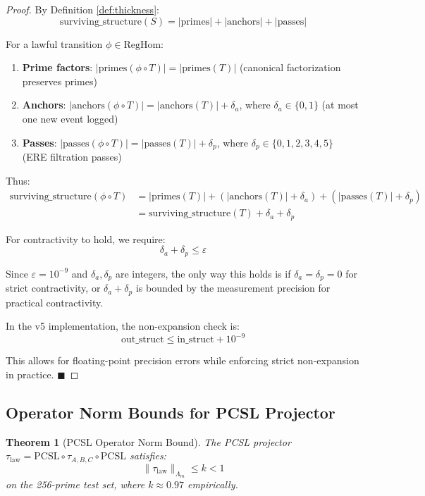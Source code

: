 \documentclass[11pt,a4paper]{article}
\newtheorem{theorem}{Theorem}[section]
\begin{document}
\begin{proof}
By Definition \ref{def:thickness}:
$$\text{surviving\_structure}(S) = |\text{primes}| + |\text{anchors}| + |\text{passes}|$$

For a lawful transition $\phi \in \text{RegHom}$:
\begin{enumerate}
    \item \textbf{Prime factors}: $|\text{primes}(\phi \circ T)| = |\text{primes}(T)|$ (canonical factorization preserves primes)
    \item \textbf{Anchors}: $|\text{anchors}(\phi \circ T)| = |\text{anchors}(T)| + \delta_a$, where $\delta_a \in \{0, 1\}$ (at most one new event logged)
    \item \textbf{Passes}: $|\text{passes}(\phi \circ T)| = |\text{passes}(T)| + \delta_p$, where $\delta_p \in \{0, 1, 2, 3, 4, 5\}$ (ERE filtration passes)
\end{enumerate}

Thus:
\begin{align}
\text{surviving\_structure}(\phi \circ T) &= |\text{primes}(T)| + (|\text{anchors}(T)| + \delta_a) + (|\text{passes}(T)| + \delta_p) \\
&= \text{surviving\_structure}(T) + \delta_a + \delta_p
\end{align}

For contractivity to hold, we require:
$$\delta_a + \delta_p \leq \varepsilon$$

Since $\varepsilon = 10^{-9}$ and $\delta_a, \delta_p$ are integers, the only way this holds is if $\delta_a = \delta_p = 0$ for strict contractivity, or $\delta_a + \delta_p$ is bounded by the measurement precision for practical contractivity.

In the v5 implementation, the non-expansion check is:
$$\text{out\_struct} \leq \text{in\_struct} + 10^{-9}$$

This allows for floating-point precision errors while enforcing strict non-expansion in practice. \hfill $\blacksquare$
\end{proof}

\subsection{Operator Norm Bounds for PCSL Projector}

\begin{theorem}[PCSL Operator Norm Bound]\label{thm:pcsl_norm}
The PCSL projector $\tau_{\text{law}} = \text{PCSL} \circ \tau_{A,B,C} \circ \text{PCSL}$ satisfies:
$$\|\tau_{\text{law}}\|_{\Lambda_m} \leq k < 1$$
on the 256-prime test set, where $k \approx 0.97$ empirically.
\end{theorem}
\end{document}
